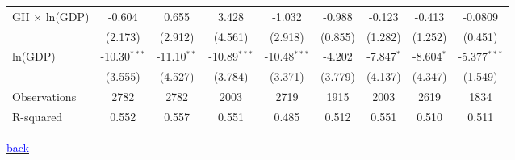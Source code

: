 \documentclass[10pt,letterpaper,subeqn]{beamer}
\begin{document}
\begin{frame}[plain,label=placebo3]
\begin{table}[htbp]
{\begin{tabular}{l*{8}{c}}
GII $\times$ ln(GDP)     &      -0.604         &       0.655         &       3.428         &      -1.032         &      -0.988         &      -0.123         &      -0.413         &     -0.0809         \\
            &     (2.173)         &     (2.912)         &     (4.561)         &     (2.918)         &     (0.855)         &     (1.282)         &     (1.252)         &     (0.451)         \\

ln(GDP)         &      -10.30$^{***}$&      -11.10$^{**}$ &      -10.89$^{***}$&      -10.48$^{***}$&      -4.202         &      -7.847$^{*}$  &      -8.604$^{*}$  &      -5.377$^{***}$\\
            &     (3.555)         &     (4.527)         &     (3.784)         &     (3.371)         &     (3.779)         &     (4.137)         &     (4.347)         &     (1.549)         \\
\hline
Observations      &        2782         &        2782         &        2003         &        2719         &        1915         &        2003         &        2619         &        1834         \\
R-squared          &       0.552         &       0.557         &       0.551         &       0.485         &       0.512         &       0.551         &       0.510         &       0.511         \\
\hline\hline
\end{tabular}}\end{table}

{\footnotesize \hyperlink{placebos}{\textcolor{blue}{back}}}
\end{frame}
\end{document}
